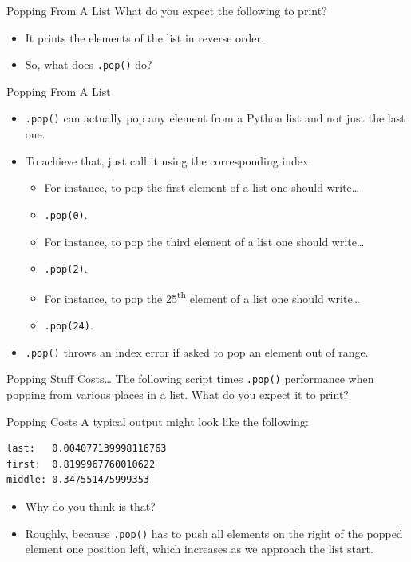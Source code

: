 \documentclass[aspectratio=169, 12pt, xcolor=table]{beamer}
\begin{document}
	\begin{frame}{Popping From A List}
		What do you expect the following to print?
		\pause
		\begin{itemize}
			\item It prints the elements of the list in reverse order.\pause
			\item So, what does \texttt{.pop()} do?
		\end{itemize}
	\end{frame}

	\begin{frame}{Popping From A List}
		\begin{itemize}
			\item \texttt{.pop()} can actually pop any element from a Python list and not just the last one.
			\item To achieve that, just call it using the corresponding index.
			\begin{itemize}
				\item For instance, to pop the first element of a list one should write\ldots\pause
				\item \texttt{.pop(0)}.
				\item For instance, to pop the third element of a list one should write\ldots\pause
				\item \texttt{.pop(2)}.
				\item For instance, to pop the 25\textsuperscript{th} element of a list one should write\ldots\pause
				\item \texttt{.pop(24)}.
			\end{itemize}
			\item \texttt{.pop()} throws an index error if asked to pop an element out of range.
		\end{itemize}		
	\end{frame}

	\begin{frame}{Popping Stuff Costs\ldots}
		The following script times \texttt{.pop()} performance when popping from various places in a list. What do you expect it to print?
		
	\end{frame}

	\begin{frame}[fragile]{Popping Costs}
		A typical output might look like the following:
		\begin{lstlisting}
last:   0.004077139998116763
first:  0.8199967760010622
middle: 0.347551475999353
\end{lstlisting}
		\begin{itemize}
			\item Why do you think is that?
			\item Roughly, because \texttt{.pop()} has to push all elements on the right of the popped element one position left, which increases as we approach the list start.
		\end{itemize}
	\end{frame}
\end{document}
